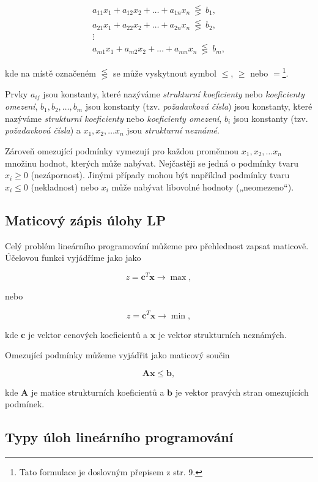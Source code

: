 \begin{equation}
    \begin{gathered}
        a_{11}x_1 + a_{12}x_2 + \ldots + a_{1n}x_n \ \lesseqgtr \ b_1, \\
        a_{21}x_1 + a_{22}x_2 + \ldots + a_{2n}x_n \ \lesseqgtr \ b_2, \\
        \vdots \\
        a_{m1}x_1 + a_{m2}x_2 + \ldots + a_{mn}x_n \ \lesseqgtr \ b_m,
    \end{gathered}
\end{equation}

kde na místě označeném $\lesseqgtr$ se může vyskytnout symbol $\leq$, $\geq$ nebo $=$\footnote{Tato formulace je doslovným přepisem z \cite{demel} str. 9.}.

Prvky $a_{ij}$ jsou konstanty, které nazýváme \textit{strukturní koeficienty} nebo \textit{koeficienty omezení},
$b_1, b_2, \ldots, b_m$
jsou konstanty (tzv. \textit{požadavková čísla})
jsou konstanty, které nazýváme \textit{strukturní koeficienty} nebo \textit{koeficienty omezení}, $b_i$ jsou konstanty (tzv. \textit{požadavková čísla})
a $x_1, x_2, \ldots x_n$ jsou \textit{strukturní neznámé}.

Zároveň omezující podmínky vymezují pro každou proměnnou $x_1, x_2, \ldots x_n$ množinu hodnot, kterých může nabývat. 
Nejčastěji se jedná o podmínky tvaru $x_i \geq 0$ (nezápornost).
Jinými případy mohou být například podmínky tvaru $x_i \leq 0$ (nekladnost) nebo $x_i$ může nabývat libovolné hodnoty („neomezeno“).

\subsection{Maticový zápis úlohy LP}

Celý problém lineárního programování můžeme pro přehlednost zapsat maticově.
Účelovou funkci vyjádříme jako
jako

\begin{equation}
    z = \bm{c}^T\bm{x} \rightarrow \max,
\end{equation}

nebo

\begin{equation}
    z = \bm{c}^T\bm{x} \rightarrow \min,
\end{equation}

kde $\bm{c}$ je vektor cenových koeficientů a $\bm{x}$ je vektor strukturních neznámých.

Omezující podmínky můžeme vyjádřit jako maticový součin

\begin{equation}
    \bm{A}\bm{x} \leq \bm{b} ,    
\end{equation}

kde $\bm{A}$ je matice strukturních koeficientů
a $\bm{b}$ je vektor pravých stran omezujících podmínek.

\subsection{Typy úloh lineárního programování}